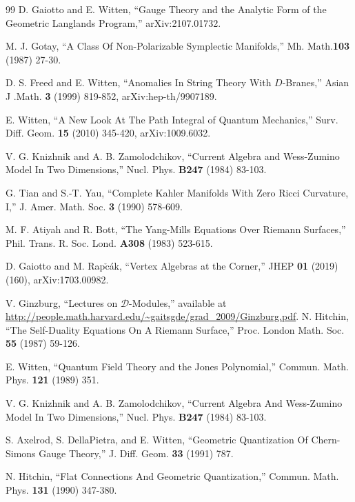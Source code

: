 \begin{thebibliography}{99}
D. Gaiotto and E. Witten, ``Gauge Theory and the Analytic Form of the Geometric Langlands Program,'' arXiv:2107.01732.

M. J. Gotay, ``A Class Of Non-Polarizable Symplectic Manifolds,'' Mh. Math.{\bf 103} (1987) 27-30.

 D. S. Freed and E. Witten, ``Anomalies In String Theory With $D$-Branes,'' 
Asian  J .Math. {\bf 3} (1999) 819-852,
arXiv:hep-th/9907189.

E. Witten, ``A New Look At The Path Integral of Quantum Mechanics,''  Surv. Diff. Geom. {\bf 15} (2010) 345-420, arXiv:1009.6032.





 V. G. Knizhnik and A. B. Zamolodchikov, ``Current Algebra and Wess-Zumino Model In Two Dimensions,'' Nucl. Phys. {\bf B247} (1984) 83-103.

G. Tian and S.-T. Yau, ``Complete Kahler Manifolds With Zero Ricci Curvature, I,'' J. Amer. Math. Soc. {\bf 3} (1990) 578-609.




M. F. Atiyah and R. Bott, ``The Yang-Mills Equations Over Riemann Surfaces,'' Phil. Trans. R. Soc. Lond.
{\bf A308} (1983) 523-615.

D. Gaiotto and M. Rap$\check{{\mathrm c}}$\'{a}k, ``Vertex Algebras at the Corner,'' JHEP {\bf 01} (2019) (160),
arXiv:1703.00982.

V. Ginzburg, ``Lectures on ${\mathcal D}$-Modules,'' available at \url{http://people.math.harvard.edu/~gaitsgde/grad_2009/Ginzburg.pdf}.
N. Hitchin, ``The Self-Duality Equations On A Riemann Surface,'' Proc. London Math. Soc.  {\bf 55}  (1987) 59-126.

E. Witten, ``Quantum Field Theory and the Jones Polynomial,'' Commun. Math. Phys. {\bf 121}   (1989) 351.

V. G. Knizhnik and A. B. Zamolodchikov, ``Current Algebra And Wess-Zumino
Model In Two Dimensions,'' Nucl. Phys. {\bf B247} (1984) 83-103.

S. Axelrod, S. DellaPietra, and E. Witten, ``Geometric Quantization Of Chern-Simons Gauge Theory,'' J. Diff. Geom. {\bf 33} (1991) 787.

N. Hitchin, ``Flat Connections And Geometric Quantization,'' Commun. Math. Phys.
{\bf 131}  (1990) 347-380.


\end{thebibliography}
